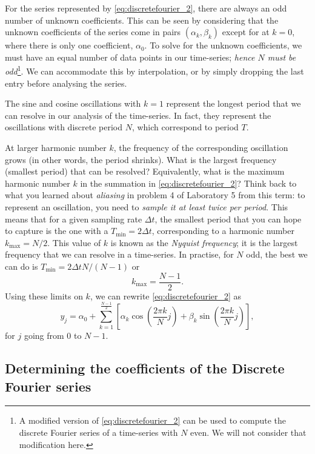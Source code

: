 \documentclass[11pt,twoside,a4paper]{article}
\begin{document}
For the series represented by \autoref{eq:discretefourier_2}, there
are always an odd number of unknown coefficients.  This can be seen by
considering that the unknown coefficients of the series come in pairs
$(\alpha_k,\beta_k)$ except for at $k=0$, where there is only one
coefficient, $\alpha_0$.  To solve for the unknown coefficients, we
must have an equal number of data points in our time-series;
\textit{hence $N$ must be odd}\footnote{A modified version of
  \autoref{eq:discretefourier_2} can be used to compute the discrete
  Fourier series of a time-series with $N$ even.  We will not consider
  that modification here.}.  We can accommodate this by interpolation,
or by simply dropping the last entry before analysing the series.

The sine and cosine oscillations with $k=1$ represent the longest
period that we can resolve in our analysis of the time-series.  In
fact, they represent the oscillations with discrete period $N$, which
correspond to period $T$.

At larger harmonic number $k$, the frequency of the corresponding
oscillation grows (in other words, the period shrinks).  What is the
largest frequency (smallest period) that can be resolved?
Equivalently, what is the maximum harmonic number $k$ in the summation
in \autoref{eq:discretefourier_2}? Think back to what you learned
about \textit{aliasing} in problem 4 of Laboratory 5 from this term:
to represent an oscillation, you need to \textit{sample it at least
  twice per period}.  This means that for a given sampling rate
$\Delta t$, the smallest period that you can hope to capture is the
one with a $T_\text{min}=2\Delta t$, corresponding to a harmonic
number $k_\text{max}=N/2$.  This value of $k$ is known as the
\textit{Nyquist frequency}; it is the largest frequency that we can
resolve in a time-series. In practise, for $N$ odd, the best we can do
is $T_\text{min}=2\Delta t N/(N-1)$ or
\begin{displaymath}
  k_\text{max} = \frac{N-1}{2}.
\end{displaymath} 
Using these limits on $k$, we can rewrite
\autoref{eq:discretefourier_2} as
\begin{equation}
  \label{eq:discretefourier}
  y_j = \alpha_0 + \sum_{k=1}^{\frac{N-1}{2}}\left[ 
    \alpha_k\cos\left(\frac{2\pi k}{N}j\right) + 
    \beta_k\sin\left(\frac{2\pi k}{N}j\right)\right], 
\end{equation}
for $j$ going from 0 to $N-1$.

\subsection{Determining the coefficients of the Discrete Fourier series}
\end{document}
